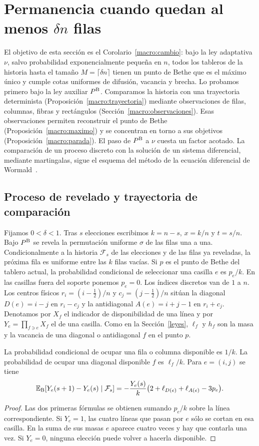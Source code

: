 \section{Permanencia cuando quedan al menos \texorpdfstring{$\delta n$}{δn} filas}\label{macro}
El objetivo de esta sección es el Corolario~\ref{macro:cambio}: bajo la ley adaptativa $\nu$, salvo
probabilidad exponencialmente pequeña en $n$, todos los tableros de la historia hasta el tamaño
$M=\lceil\delta n\rceil$ tienen un punto de Bethe que es el máximo único y cumple cotas uniformes de
difusión, vacancia y brecha. Lo probamos primero bajo la ley auxiliar $P^{\rm B}$. Comparamos la
historia con una trayectoria determinista (Proposición~\ref{macro:trayectoria}) mediante
observaciones de filas, columnas, fibras y rectángulos (Sección~\ref{macro:observaciones}). Esas
observaciones permiten reconstruir el punto de Bethe (Proposición~\ref{macro:maximo}) y se
concentran en torno a sus objetivos (Proposición~\ref{macro:parada}). El paso de $P^{\rm B}$ a
$\nu$ cuesta un factor acotado. La comparación de un proceso discreto con la solución de un sistema
diferencial, mediante martingalas, sigue el esquema del método de la ecuación diferencial de
Wormald~\cite{wormald}.

\subsection{Proceso de revelado y trayectoria de comparación}

Fijamos $0<\delta<1$. Tras $s$ elecciones escribimos $k=n-s$, $x=k/n$ y $t=s/n$. Bajo $P^{\rm B}$ se
revela la permutación uniforme $\sigma$ de las filas una a una. Condicionalmente a la historia
$\mathcal F_s$ de las elecciones y de las filas ya reveladas, la próxima fila es uniforme entre las
$k$ filas vacías. Si $p$ es el punto de Bethe del tablero actual, la probabilidad condicional de
seleccionar una
casilla $e$ es $p_e/k$. En las casillas fuera del soporte ponemos $p_e=0$. Los índices discretos van de
$1$ a $n$. Los centros físicos
$r_i=(i-\tfrac12)/n$ y $c_j=(j-\tfrac12)/n$ sitúan la diagonal $D(e)=i-j$ en $r_i-c_j$ y la
antidiagonal $A(e)=i+j-1$ en $r_i+c_j$. Denotamos por $X_f$ el indicador de disponibilidad de una
línea y por $Y_e=\prod_{f\ni e}X_f$ el de una casilla. Como en la Sección~\ref{leyes}, $\ell_f$ y
$h_f$ son la masa y la vacancia de una diagonal o antidiagonal $f$ en el punto $p$.

\begin{lema}\label{macro:casilla}
La probabilidad condicional de ocupar una fila o columna disponible es $1/k$. La probabilidad de
ocupar una diagonal disponible $f$ es $\ell_f/k$. Para $e=(i,j)$ se tiene
\[
 \mathbb{E}_{\rm B}[Y_e(s+1)-Y_e(s)\mid\mathcal F_s]
 =-\frac{Y_e(s)}{k}\bigl(2+\ell_{D(e)}+\ell_{A(e)}-3p_e\bigr).
\]
\end{lema}
\begin{proof}
Las dos primeras fórmulas se obtienen sumando $p_e/k$ sobre la línea correspondiente. Si $Y_e=1$, las
cuatro líneas que pasan por $e$ sólo se cortan en esa casilla. En la suma de sus masas $e$ aparece
cuatro veces y hay que contarla una vez. Si $Y_e=0$, ninguna elección puede volver a hacerla
disponible.
\end{proof}

